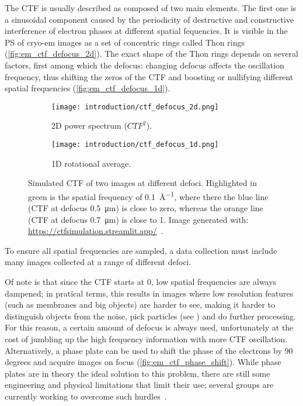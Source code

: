 The CTF is usually described as composed of two main elements.
The first one is a sinusoidal component caused by the periodicity of destructive and constructive interference of electron phases at different spatial fequencies.
It is visible in the PS of cryo-em images as a set of concentric rings called Thon rings (\autoref{fig:em_ctf_defocus_2d}).
The exact shape of the Thon rings depends on several factors, first among which the defocus: changing defocus affects the oscillation frequency, thus shifting the zeros of the CTF and boosting or nullifying different spatial frequencies (\autoref{fig:em_ctf_defocus_1d}).

\begin{figure}[ht]
    \centering
    \begin{subfigure}{.6\textwidth}
        \centering
        \texttt{[image: introduction/ctf\_defocus\_2d.png]}
        \caption{2D power spectrum ($CTF^2$).}
        \label{fig:em_ctf_defocus_2d}
    \end{subfigure}%

    \begin{subfigure}{\textwidth}
        \centering
        \texttt{[image: introduction/ctf\_defocus\_1d.png]}
        \caption{1D rotational average.}
        \label{fig:em_ctf_defocus_1d}
    \end{subfigure}%

    \caption[CTF: effect of defocus]{Simulated CTF of two images at different defoci. Highlighted in green is the spatial frequency of \qty{0.1}{\angstrom^{-1}}, where there the blue line (CTF at defocus \qty{0.5}{\micro\meter}) is close to zero, whereas the orange line (CTF at defocus \qty{0.7}{\micro\meter}) is close to 1. Image generated with: \url{https://ctfsimulation.streamlit.app/}~\cite{jiangWebbasedSimulationContrast2001}.}
    \label{fig:em_ctf_defocus}
\end{figure}

To ensure all spatial frequencies are sampled, a data collection must include many images collected at a range of different defoci.

Of note is that since the CTF starts at \num{0}, low spatial frequencies are always dampened; in pratical terms, this results in images where low resolution features (such as membranes and big objects) are harder to see, making it harder to distinguish objects from the noise, pick particles (see ) and do further processing.
For this reason, a certain amount of defocus is always used, unfortunately at the cost of jumbling up the high frequency information with more CTF oscillation.
Alternatively, a phase plate can be used to shift the phase of the electrons by 90 degrees and acquire images on focus (\autoref{fig:em_ctf_phase_shift}).
While phase plates are in theory the ideal solution to this problem, there are still some engineering and physical limitations that limit their use; several groups are currently working to overcome such hurdles~\cite{danevExpandingBoundariesCryoEM2017,schwartzLaserPhasePlate2019}.

